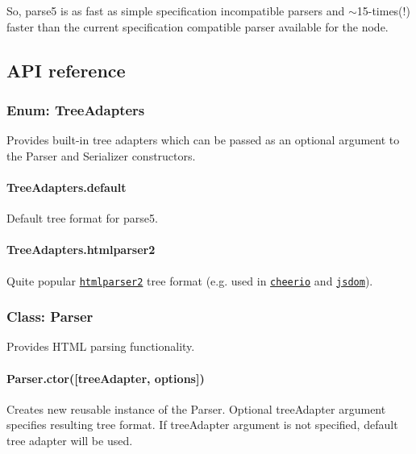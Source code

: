 So, parse5 is as fast as simple specification incompatible parsers and $\sim$15-\/times(!) faster than the current specification compatible parser available for the node.

\subsection*{A\+PI reference}

\subsubsection*{Enum\+: Tree\+Adapters}

Provides built-\/in tree adapters which can be passed as an optional argument to the {\ttfamily Parser} and {\ttfamily Serializer} constructors.

\paragraph*{\textbullet{} Tree\+Adapters.\+default}

Default tree format for parse5.

\paragraph*{\textbullet{} Tree\+Adapters.\+htmlparser2}

Quite popular \href{https://github.com/fb55/htmlparser2}{\tt htmlparser2} tree format (e.\+g. used in \href{https://github.com/MatthewMueller/cheerio}{\tt cheerio} and \href{https://github.com/tmpvar/jsdom}{\tt jsdom}). 



\subsubsection*{Class\+: Parser}

Provides H\+T\+ML parsing functionality.

\paragraph*{\textbullet{} Parser.\+ctor(\mbox{[}tree\+Adapter, options\mbox{]})}

Creates new reusable instance of the {\ttfamily Parser}. Optional {\ttfamily tree\+Adapter} argument specifies resulting tree format. If {\ttfamily tree\+Adapter} argument is not specified, {\ttfamily default} tree adapter will be used.

